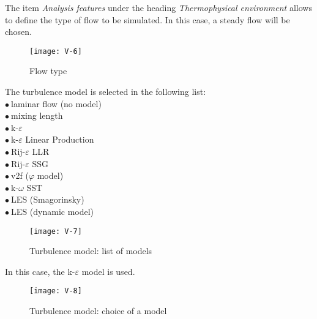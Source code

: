 \clearpage
The item {\itshape Analysis features} under the heading {\itshape Thermophysical
environment} allows to define the type of flow to be simulated. In this case, a
steady flow will be chosen.

\begin{figure}[ht]
\begin{center}
\texttt{[image: V-6]}
\caption{Flow type}
\label{fig7_e1}
\end{center}
\end{figure}


\clearpage
The turbulence model is selected in the following list:\\
\hspace*{1cm}$\bullet\ $laminar flow (no model)\\
\hspace*{1cm}$\bullet\ $mixing length\\
\hspace*{1cm}$\bullet\ $k-$\varepsilon$\\
\hspace*{1cm}$\bullet\ $k-$\varepsilon$ Linear Production\\
\hspace*{1cm}$\bullet\ $Rij-$\varepsilon$ LLR\\
\hspace*{1cm}$\bullet\ $Rij-$\varepsilon$ SSG\\
\hspace*{1cm}$\bullet\ $v2f ($\varphi$ model)\\
\hspace*{1cm}$\bullet\ $k-$\omega$ SST\\
\hspace*{1cm}$\bullet\ $LES (Smagorinsky)\\
\hspace*{1cm}$\bullet\ $LES (dynamic model)

\begin{figure}[ht]
\begin{center}
\texttt{[image: V-7]}
\caption{Turbulence model: list of models}
\label{fig9_e1}
\end{center}
\end{figure}


\clearpage
In this case, the k-$\varepsilon$ model is used.

\begin{figure}[ht]
\begin{center}
\texttt{[image: V-8]}
\caption{Turbulence model: choice of a model}
\label{fig10_e1}
\end{center}
\end{figure}


